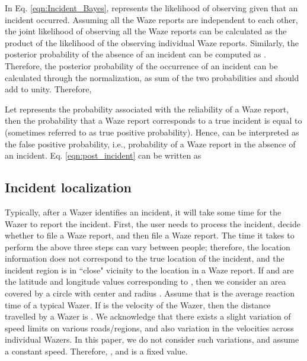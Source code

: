 \documentclass[conference]{IEEEtran}
\begin{document}
In Eq. \ref{eqn:Incident_Bayes},  represents the likelihood of observing  given that an incident occurred. Assuming all the  Waze reports are independent to each other, the joint likelihood of observing all the  Waze reports can be calculated as the product of the likelihood of the observing individual Waze reports. Similarly, the posterior probability of the absence of an incident can be computed as . Therefore, the posterior probability of the occurrence of an incident can be calculated through the normalization, as sum of the two probabilities  and  should add to unity. Therefore, 

\vspace{-0.18in}


Let  represents the probability associated with the reliability  of a Waze report, then the probability that a Waze report corresponds to a true incident is equal to  (sometimes referred to as true positive probability). Hence,  can be interpreted as the false positive probability, i.e., probability of a Waze report in the absence of an incident. Eq. \ref{eqn:post_incident} can be written as

\vspace{-0.18in}



\subsection{Incident localization}
\label{subsec:local}





Typically, after a Wazer identifies an incident, it will take some time for the Wazer to report the incident. First, the user needs to process the incident, decide whether to file a Waze report, and then file a Waze report. The time it takes to perform the above three steps can vary between people; therefore, the location information does not correspond to the true location of the incident, and the incident region is in ``close" vicinity to the location in a Waze report. If  and  are the latitude and longitude values corresponding to , then we consider an area covered by a circle with center  and radius . Assume that  is the average reaction time of a typical Wazer. 
If  is the velocity of the Wazer, then the distance travelled by a Wazer is .
We acknowledge that there exists a slight variation of speed limits on various roads/regions, and also variation in the velocities across individual Wazers. In this paper, we do not consider such variations, and assume a constant speed. Therefore, , and is a fixed value.
\end{document}
